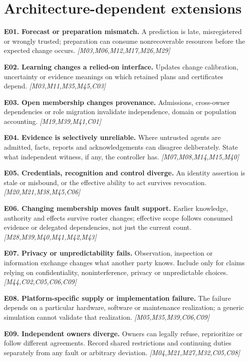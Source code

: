 \documentclass[11pt]{article}
\newcommand{\f}[4]{\par\smallskip\noindent\textbf{#1. #2.} #3 \textit{[#4]}\par}
\begin{document}
\section{Architecture-dependent extensions}
\f{E01}{Forecast or preparation mismatch}{A prediction is late, misregistered or wrongly trusted; preparation can consume nonrecoverable resources before the expected change occurs.}{M03,M06,M12,M17,M26,M29}
\f{E02}{Learning changes a relied-on interface}{Updates change calibration, uncertainty or evidence meanings on which retained plans and certificates depend.}{M03,M11,M35,M45,C03}
\f{E03}{Open membership changes provenance}{Admissions, cross-owner dependencies or role migration invalidate independence, domain or population accounting.}{M19,M39,M41,C01}
\f{E04}{Evidence is selectively unreliable}{Where untrusted agents are admitted, facts, reports and acknowledgements can disagree deliberately. State what independent witness, if any, the controller has.}{M07,M08,M14,M15,M40}
\f{E05}{Credentials, recognition and control diverge}{An identity assertion is stale or misbound, or the effective ability to act survives revocation.}{M20,M21,M38,M45,C06}
\f{E06}{Changing membership moves fault support}{Earlier knowledge, authority and effects survive roster changes; effective scope follows consumed evidence or delegated dependencies, not just the current count.}{M28,M39,M40,M41,M42,M43}
\f{E07}{Privacy or unpredictability fails}{Observation, inspection or information exchange changes what another party knows. Include only for claims relying on confidentiality, noninterference, privacy or unpredictable choices.}{M44,C02,C05,C06,C09}
\f{E08}{Platform-specific supply or implementation failure}{The failure depends on a particular hardware, software or maintenance realization; a generic simulation cannot validate that realization.}{M05,M35,M39,C06,C09}
\f{E09}{Independent owners diverge}{Owners can legally refuse, reprioritize or follow different agreements. Record shared restrictions and continuing duties separately from any fault or arbitrary deviation.}{M04,M21,M27,M32,C05,C08}
\end{document}
